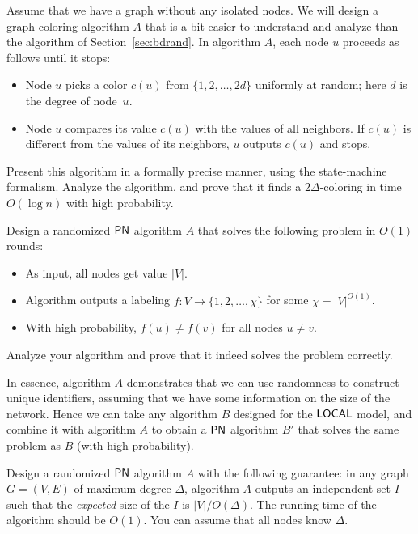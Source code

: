 \begin{ex}\label{ex:bdrand2delta}
    Assume that we have a graph without any isolated nodes. We will design a graph-coloring algorithm $A$ that is a bit easier to understand and analyze than the algorithm of Section~\ref{sec:bdrand}. In algorithm $A$, each node $u$ proceeds as follows until it stops:
    \begin{itemize}
        \item Node $u$ picks a color $c(u)$ from $\{1,2,\dotsc,2d\}$ uniformly at random; here $d$ is the degree of node~$u$.
        \item Node $u$ compares its value $c(u)$ with the values of all neighbors. If $c(u)$ is different from the values of its neighbors, $u$ outputs $c(u)$ and stops.
    \end{itemize}
    Present this algorithm in a formally precise manner, using the state-machine formalism. Analyze the algorithm, and prove that it finds a $2\Delta$-coloring in time $O(\log n)$ with high probability.
\end{ex}

\begin{ex}\label{ex:randomness-to-unique-ids}
    Design a randomized $\textup{\sffamily PN}$ algorithm $A$ that solves the following problem in $O(1)$ rounds:
    \begin{itemize}[noitemsep]
        \item As input, all nodes get value $|V|$.
        \item Algorithm outputs a labeling $f\colon V \to \{1,2,\dotsc,\chi\}$ for some $\chi = |V|^{O(1)}$.
        \item With high probability, $f(u) \ne f(v)$ for all nodes $u \ne v$.
    \end{itemize}
    Analyze your algorithm and prove that it indeed solves the problem correctly.

    In essence, algorithm $A$ demonstrates that we can use randomness to construct unique identifiers, assuming that we have some information on the size of the network. Hence we can take any algorithm $B$ designed for the $\textup{\sffamily LOCAL}$ model, and combine it with algorithm $A$ to obtain a $\textup{\sffamily PN}$ algorithm $B'$ that solves the same problem as $B$ (with high probability).
\end{ex}

\begin{ex}
    Design a randomized $\textup{\sffamily PN}$ algorithm $A$ with the following guarantee: in any graph $G = (V,E)$ of maximum degree $\Delta$, algorithm $A$ outputs an independent set $I$ such that the \emph{expected} size of the $I$ is $|V|/O(\Delta)$. The running time of the algorithm should be $O(1)$. You can assume that all nodes know $\Delta$.
\end{ex}

